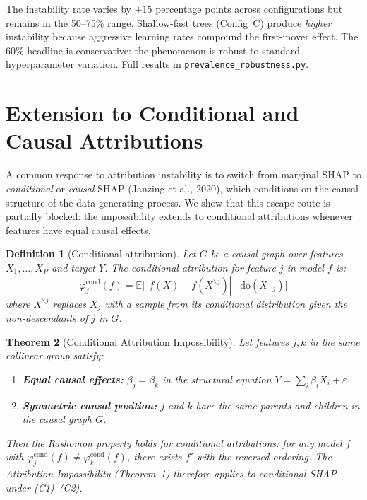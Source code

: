 \documentclass{article}
\newtheorem{theorem}{Theorem}
\newtheorem{definition}[theorem]{Definition}
\begin{document}
The instability rate varies by $\pm 15$ percentage points across
configurations but remains in the 50--75\% range. Shallow-fast trees
(Config~C) produce \emph{higher} instability because aggressive
learning rates compound the first-mover effect. The 60\% headline
is conservative: the phenomenon is robust to standard hyperparameter
variation. Full results in \texttt{prevalence\_robustness.py}.

\section{Extension to Conditional and Causal Attributions}

A common response to attribution instability is to switch from
marginal SHAP to \emph{conditional} or \emph{causal} SHAP
(Janzing et al., 2020), which conditions on the causal structure
of the data-generating process. We show that this escape route is
partially blocked: the impossibility extends to conditional
attributions whenever features have equal causal effects.

\begin{definition}[Conditional attribution]
Let $G$ be a causal graph over features $X_1, \ldots, X_P$ and
target $Y$. The \emph{conditional attribution} for feature $j$ in
model $f$ is:
\[
    \varphi_j^{\text{cond}}(f) = \mathbb{E}\big[\,
    |f(X) - f(X^{\backslash j})| \;\big|\; \text{do}(X_{-j})\big]
\]
where $X^{\backslash j}$ replaces $X_j$ with a sample from its
conditional distribution given the non-descendants of $j$ in $G$.
\end{definition}

\begin{theorem}[Conditional Attribution Impossibility]
\label{thm:conditional-impossibility}
Let features $j, k$ in the same collinear group satisfy:
\begin{enumerate}
    \item[(C1)] \textbf{Equal causal effects:}
      $\beta_j = \beta_k$ in the structural equation
      $Y = \sum_i \beta_i X_i + \varepsilon$.
    \item[(C2)] \textbf{Symmetric causal position:}
      $j$ and $k$ have the same parents and children in
      the causal graph $G$.
\end{enumerate}
Then the Rashomon property holds for conditional attributions:
for any model $f$ with
$\varphi_j^{\text{cond}}(f) \neq \varphi_k^{\text{cond}}(f)$,
there exists $f'$ with the reversed ordering.
The Attribution Impossibility (Theorem~1) therefore applies to
conditional SHAP under (C1)--(C2).
\end{theorem}
\end{document}
